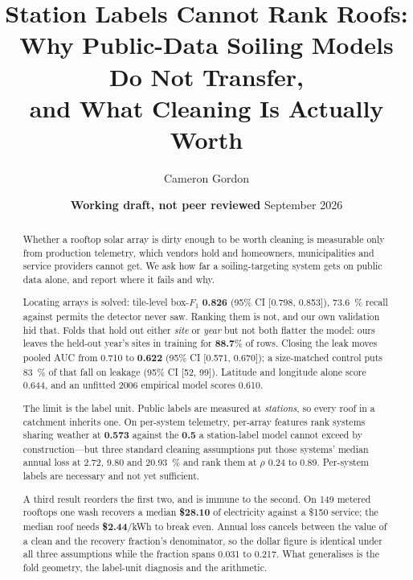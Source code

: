 \documentclass[10pt,twocolumn]{article}
\title{\bf Station Labels Cannot Rank Roofs:\\
Why Public-Data Soiling Models Do Not Transfer,\\
and What Cleaning Is Actually Worth}
\author{Cameron Gordon}
\date{\normalsize\textbf{Working draft, not peer reviewed} \quad September 2026}
\begin{document}
\onecolumn
\maketitle
\thispagestyle{empty}

\begin{center}
\begin{minipage}{0.84\textwidth}
\begin{abstract}
\noindent
Whether a rooftop solar array is dirty enough to be worth cleaning is measurable only from
production telemetry, which vendors hold and homeowners, municipalities and service
providers cannot get. We ask how far a soiling-targeting system gets on public data alone,
and report where it fails and why.

Locating arrays is solved: tile-level box-$F_1$ \textbf{0.826} (95\% CI [0.798, 0.853]),
\SI{73.6}{\percent} recall against permits the detector never saw. Ranking them is not, and
our own validation hid that. Folds that hold out either \emph{site} or \emph{year} but not
both flatter the model: ours leaves the held-out year's sites in training for
\textbf{88.7}\% of rows. Closing the leak moves pooled AUC from 0.710 to \textbf{0.622}
(95\% CI [0.571, 0.670]); a size-matched control puts \SI{83}{\percent} of that fall on
leakage (95\% CI [52, 99]). Latitude and longitude alone score 0.644, and an unfitted 2006
empirical model scores 0.610.

The limit is the label unit. Public labels are measured at \emph{stations}, so every roof
in a catchment inherits one. On per-system telemetry, per-array features rank systems
sharing weather at \textbf{0.573} against the \textbf{0.5} a station-label model cannot
exceed by construction---but three standard cleaning assumptions put those systems' median
annual loss at 2.72, 9.80 and \SI{20.93}{\percent} and rank them at $\rho$ 0.24 to 0.89.
Per-system labels are necessary and not yet sufficient.

A third result reorders the first two, and is immune to the second. On 149 metered
rooftops one wash recovers a median \textbf{\$28.10} of electricity against a \$150
service; the median roof needs \textbf{\$2.44}/kWh to break even. Annual loss cancels
between the value of a clean and the recovery fraction's denominator, so the dollar figure
is identical under all three assumptions while the fraction spans 0.031 to 0.217. What
generalises is the fold geometry, the label-unit diagnosis and the arithmetic.
\end{abstract}
\end{minipage}
\end{center}
\end{document}
